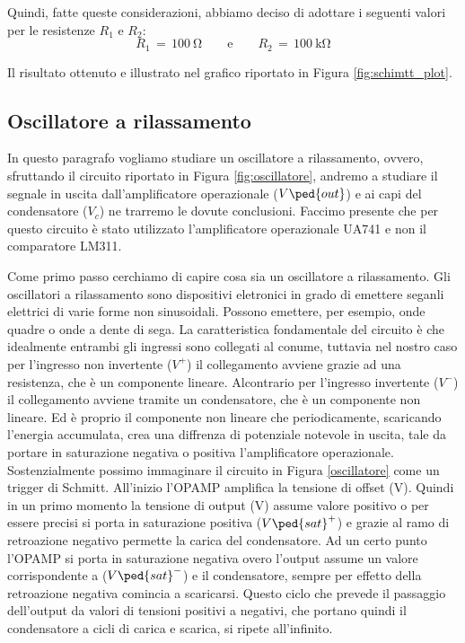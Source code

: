 Quindi, fatte queste considerazioni, abbiamo deciso di adottare i seguenti valori per le resistenze $R_1$ e $R_2$:
\begin{equation}
        R_1\,=\,\SI{100}{\ohm} \qquad \text{e} \qquad R_2\,=\,\SI{100}{\kilo\ohm}
\end{equation}

Il risultato ottenuto e illustrato nel grafico riportato in Figura \ref{fig:schimtt_plot}.

\subsection*{Oscillatore a rilassamento}

In questo paragrafo vogliamo studiare un oscillatore a rilassamento, ovvero, sfruttando il circuito riportato in Figura \ref{fig:oscillatore}, andremo a studiare il segnale in uscita dall'amplificatore operazionale ($V\ped{out}$) e ai capi del condensatore ($V_c$) ne trarremo le dovute conclusioni. Faccimo presente che per questo circuito è stato utilizzato l'amplificatore operazionale UA741 e non il comparatore LM311.

Come primo passo cerchiamo di capire cosa sia un oscillatore a rilassamento. Gli oscillatori a rilassamento sono dispositivi eletronici in grado di emettere seganli elettrici di varie forme non sinusoidali. Possono emettere, per esempio, onde quadre o onde a dente di sega.
La caratteristica fondamentale del circuito è che idealmente entrambi gli ingressi sono collegati al conume, tuttavia nel nostro caso per l'ingresso non invertente ($V^+$) il collegamento avviene grazie ad una resistenza, che è un componente lineare. Alcontrario per l'ingresso invertente ($V^-$) il collegamento avviene tramite un condensatore, che è un componente non lineare. Ed è proprio il componente non lineare che periodicamente, scaricando l'energia accumulata, crea una diffrenza di potenziale notevole in uscita, tale da portare in saturazione negativa o positiva l'amplificatore operazionale.
Sostenzialmente possimo immaginare il circuito in Figura \ref{oscillatore} come un trigger di Schmitt. All'inizio l'OPAMP amplifica la tensione di offset (V). Quindi in un primo momento la tensione di output (V) assume valore positivo o per essere precisi si porta in saturazione positiva ($V\ped{sat}^+$) e grazie al ramo di retroazione negativo permette la carica del condensatore. Ad un certo punto l'OPAMP si porta in saturazione negativa overo l'output assume un valore corrispondente a ($V\ped{sat}^-$) e il condensatore, sempre per effetto della retroazione negativa comincia a scaricarsi. Questo ciclo che prevede il passaggio dell'output da valori di tensioni positivi a negativi, che portano quindi il condensatore a cicli di carica e scarica, si ripete all'infinito.

